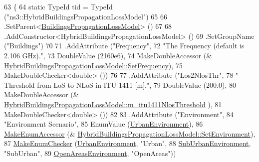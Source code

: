 \begin{DoxyCode}
63 \{
64   \textcolor{keyword}{static} TypeId tid = TypeId (\textcolor{stringliteral}{"ns3::HybridBuildingsPropagationLossModel"})
65     
66     .SetParent<\hyperlink{classns3_1_1BuildingsPropagationLossModel_ab23ac72e775bd5e1d4ee4720e73761c0}{BuildingsPropagationLossModel}> ()
67     
68     .AddConstructor<HybridBuildingsPropagationLossModel> ()
69     .SetGroupName (\textcolor{stringliteral}{"Buildings"})
70     
71     .AddAttribute (\textcolor{stringliteral}{"Frequency"},
72                    \textcolor{stringliteral}{"The Frequency  (default is 2.106 GHz)."},
73                    DoubleValue (2160e6),
74                    MakeDoubleAccessor (&
      \hyperlink{classns3_1_1HybridBuildingsPropagationLossModel_a5810ee59a316be4e56b6859e3779c40a}{HybridBuildingsPropagationLossModel::SetFrequency}),
75                    MakeDoubleChecker<double> ())
76 
77     .AddAttribute (\textcolor{stringliteral}{"Los2NlosThr"},
78                    \textcolor{stringliteral}{" Threshold from LoS to NLoS in ITU 1411 [m]."},
79                    DoubleValue (200.0),
80                    MakeDoubleAccessor (&
      \hyperlink{classns3_1_1HybridBuildingsPropagationLossModel_aa9dfb4ea7e65ff4cfb1f37c48b921ac6}{HybridBuildingsPropagationLossModel::m\_itu1411NlosThreshold}
      ),
81                    MakeDoubleChecker<double> ())
82 
83     .AddAttribute (\textcolor{stringliteral}{"Environment"},
84                    \textcolor{stringliteral}{"Environment Scenario"},
85                    EnumValue (\hyperlink{group__propagation_gga0e392ed771a28c92112047e63308a53aad575d1b07ccac0218783bbd0f523784c}{UrbanEnvironment}),
86                    \hyperlink{namespacens3_af5050739867ce63896dec011e332c8ec}{MakeEnumAccessor} (&
      \hyperlink{classns3_1_1HybridBuildingsPropagationLossModel_ada6b3db511b64555b4d5c70f2bacc7ea}{HybridBuildingsPropagationLossModel::SetEnvironment}),
87                    \hyperlink{namespacens3_a48832781a2b521d3d0091e05ece30615}{MakeEnumChecker} (\hyperlink{group__propagation_gga0e392ed771a28c92112047e63308a53aad575d1b07ccac0218783bbd0f523784c}{UrbanEnvironment}, \textcolor{stringliteral}{"Urban"},
88                                     \hyperlink{group__propagation_gga0e392ed771a28c92112047e63308a53aa06cbfe108cde1eb2070702b2ed4fb189}{SubUrbanEnvironment}, \textcolor{stringliteral}{"SubUrban"},
89                                     \hyperlink{group__propagation_gga0e392ed771a28c92112047e63308a53aa51f78effebc3753d7cd2ee9b5924c028}{OpenAreasEnvironment}, \textcolor{stringliteral}{"OpenAreas"}))

\end{DoxyCode}
